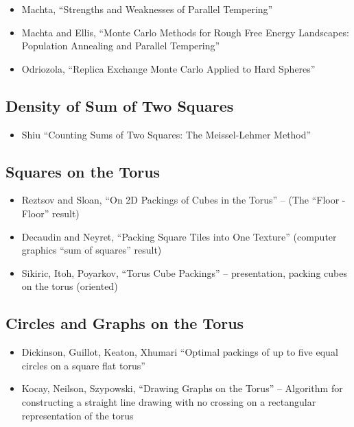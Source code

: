 \documentclass[11pt]{article}
\begin{document}
\begin{itemize}
\item Machta, ``Strengths and Weaknesses of Parallel Tempering''  \cite{Machta2010}
\item Machta and Ellis, ``Monte Carlo Methods for Rough Free Energy Landscapes: Population Annealing and Parallel Tempering'' \cite{Machta2011}
\item Odriozola,  ``Replica Exchange Monte Carlo Applied to Hard Spheres''  \cite{Odriozola2009}
\end{itemize}
\subsection{Density of Sum of Two Squares}
\label{sec-1.3}

\begin{itemize}
\item Shiu ``Counting Sums of Two Squares: The Meissel-Lehmer Method'' \cite{Shiu1986}
\end{itemize}
\subsection{Squares on the Torus}
\label{sec-1.4}

\begin{itemize}
\item Reztsov and Sloan, ``On 2D Packings of Cubes in the Torus'' -- (The ``Floor - Floor'' result) \cite{Reztsov1997}
\item Decaudin and Neyret, ``Packing Square Tiles into One Texture''  (computer graphics ``sum of squares'' result) \cite{Decaudin2004}
\item Sikiric, Itoh, Poyarkov, ``Torus Cube Packings'' \cite{Sikiric} -- presentation, packing cubes on the torus (oriented)
\end{itemize}
\subsection{Circles and Graphs on the Torus}
\label{sec-1.5}

\begin{itemize}
\item Dickinson, Guillot, Keaton, Xhumari  ``Optimal packings of up to five equal circles on a square flat torus'' \cite{Dickinson2011}
\item Kocay, Neilson, Szypowski, ``Drawing Graphs on the Torus'' -- Algorithm for constructing a straight line drawing with no crossing on a rectangular representation of the torus \cite{Kocay2001}
\end{itemize}
\end{document}
